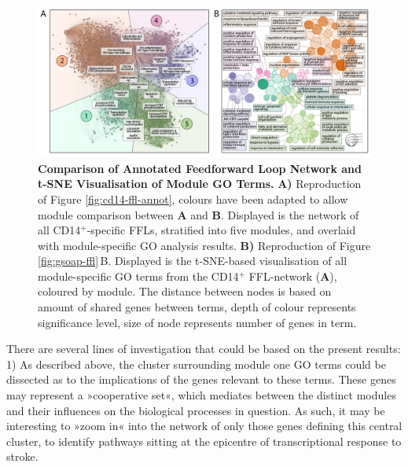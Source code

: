 \begin{figure}
\centering
\includegraphics[width=\textwidth]{figures/ffl-gsoap-comp}
\caption[Comparison of Annotated Feedforward Loop Network and t-SNE Visualisation of Module GO Terms.]{\textbf{Comparison of Annotated Feedforward Loop Network and t-SNE Visualisation of Module GO Terms.} \textbf{A)} Reproduction of Figure \ref{fig:cd14-ffl-annot}, colours have been adapted to allow module comparison between \textbf{A} and \textbf{B}. Displayed is the network of all CD14$^+$-specific FFLs, stratified into five modules, and overlaid with module-specific GO analysis results. \textbf{B)} Reproduction of Figure \ref{fig:gsoap-ffl}\,B. Displayed is the t-SNE-based visualisation of all module-specific GO terms from the CD14$^+$ FFL-network (\textbf{A}), coloured by module. The distance between nodes is based on amount of shared genes between terms, depth of colour represents significance level, size of node represents number of genes in term.
\label{fig:ffl-gsoap-comp}}
\end{figure}

There are several lines of investigation that could be based on the present results: 1) As described above, the cluster surrounding module one GO terms could be dissected as to the implications of the genes relevant to these terms. These genes may represent a »cooperative set«, which mediates between the distinct modules and their influences on the biological processes in question. As such, it may be interesting to »zoom in« into the network of only those genes defining this central cluster, to identify pathways sitting at the epicentre of transcriptional response to stroke.

